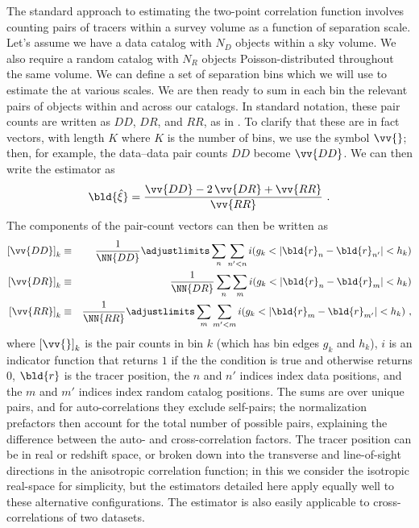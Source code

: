 The standard approach to estimating the two-point correlation function involves counting pairs of tracers within a survey volume as a function of separation scale.
Let's assume we have a data catalog with $N_D$ objects within a sky volume.
We also require a random catalog with $N_R$ objects Poisson-distributed throughout the same volume.
We can define a set of separation bins which we will use to estimate the \cf at various scales.
We are then ready to sum in each bin the relevant pairs of objects within and across our catalogs.
In standard notation, these pair counts are written as $DD$, $DR$, and $RR$, as in .
To clarify that these are in fact vectors, with length $K$ where $K$ is the number of bins, we use the symbol $\vv{}$; then, for example, the data--data pair counts $DD$ become $\vv{DD}$.
We can then write the \LS estimator as 
\begin{equation} \label{eq:ls}
    \bld{\hat{\xi}} = \frac{\vv{DD} - 2\,\vv{DR} + \vv{RR}}{\vv{RR}} ~.
\end{equation}
The components of the pair-count vectors can then be written as
\begin{eqnarray}\displaystyle
    \label{eq:ls1}
    \left[ \vv{DD} \right]_k &\equiv& \frac{1}{\NN{DD}} \adjustlimits \sum_{n} \sum_{n' < n} i(g_k < |\bld{r}_n - \bld{r}_{n'}| < h_k) \\ 
    \left[ \vv{DR} \right]_k &\equiv& \frac{1}{\NN{DR}}\sum_{n} \sum_{m} i(g_k < |\bld{r}_n - \bld{r}_m| < h_k) \\
    \label{eq:ls3}
    \left[ \vv{RR} \right]_k &\equiv& \frac{1}{\NN{RR}} \adjustlimits\sum_{m} \sum_{m'<m} i(g_k < |\bld{r}_m - \bld{r}_{m'}| < h_k) ~,
\end{eqnarray}
where $\left[ \vv{} \right]_k$ is the pair counts in bin $k$ (which has bin edges $g_k$ and $h_k$), $i$ is an indicator function that returns $1$ if the the condition is true and otherwise returns $0$, $\bld{r}$ is the tracer position, the $n$ and $n'$ indices index data positions, and the $m$ and $m'$ indices index random catalog positions.
The sums are over unique pairs, and for auto-correlations they exclude self-pairs; the normalization prefactors then account for the total number of possible pairs, explaining the difference between the auto- and cross-correlation factors.
The tracer position can be in real or redshift space, or broken down into the transverse and line-of-sight directions in the anisotropic correlation function; in this \documentname we consider the isotropic real-space \cf for simplicity, but the estimators detailed here apply equally well to these alternative configurations.
The estimator is also easily applicable to cross-correlations of two datasets.
 
